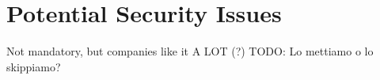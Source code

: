\section{Potential Security Issues}
Not mandatory, but companies like it A LOT (?) TODO: Lo mettiamo o lo skippiamo?
